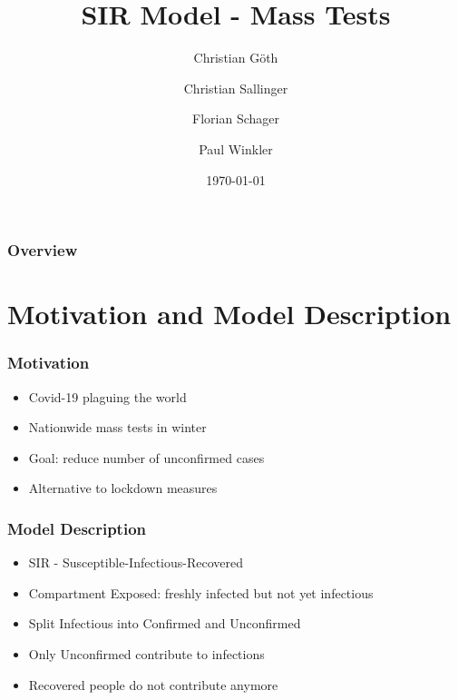\documentclass{beamer}
\title[SIR - Mass Tests]{SIR Model - Mass Tests} %
\author
{
  Christian Göth
  \and
  Christian Sallinger
  \and
  Florian Schager
  \and
  Paul Winkler
}
\date{\today} %
\begin{document}
\begin{frame}
\titlepage %
\end{frame}

\begin{frame}
\frametitle{Overview} %
\tableofcontents %
\end{frame}


\section{Motivation and Model Description} %






\begin{frame}
\frametitle{Motivation}
\begin{itemize}
  \item Covid-19 plaguing the world
  \item Nationwide mass tests in winter
  \item Goal: reduce number of unconfirmed cases
  \item Alternative to lockdown measures
\end{itemize}
\end{frame}


\begin{frame}
\frametitle{Model Description}
\begin{itemize}
\item SIR - Susceptible-Infectious-Recovered
\item Compartment Exposed: freshly infected but not yet infectious
\item Split Infectious into Confirmed and Unconfirmed
\item Only Unconfirmed contribute to infections
\item Recovered people do not contribute anymore
\end{itemize}
\end{frame}
\end{document}
